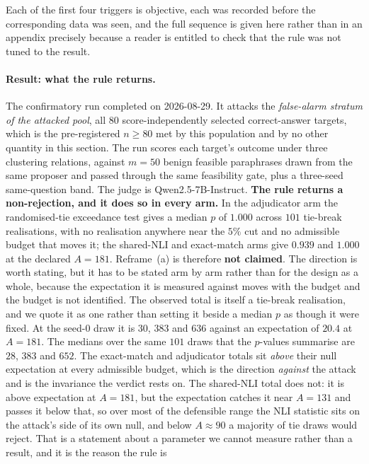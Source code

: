 Each of the first four triggers is objective, each was recorded before the corresponding data
was seen, and the full sequence is given here rather than in an appendix precisely because a
reader is entitled to check that the rule was not tuned to the result.

\paragraph{Result: what the rule returns.}
The confirmatory run completed on 2026-08-29. It attacks the \emph{false-alarm stratum of the
attacked pool}, all $80$ score-independently selected correct-answer targets, which is the
pre-registered $n{\geq}80$ met by this population and by no other quantity in this section. The
run scores each target's outcome under three clustering relations, against $m{=}50$ benign feasible
paraphrases drawn from the same proposer and passed through the same feasibility gate, plus a
three-seed same-question band. The judge is Qwen2.5-7B-Instruct. \textbf{The rule returns a
non-rejection, and it does so in every arm.} In the adjudicator arm the randomised-tie
exceedance test gives a median $p$ of $1.000$ across $101$ tie-break realisations, with no
realisation anywhere near the $5\%$ cut and no admissible budget that moves it; the shared-NLI
and exact-match arms give $0.939$ and $1.000$ at the declared $A{=}181$.
Reframe~(a) is therefore \textbf{not claimed}. The direction is worth stating, but it has to
be stated arm by arm rather than for the design as a whole, because the expectation it is
measured against moves with the budget and the budget is not identified.
The observed total is itself a tie-break realisation, and we quote it as one rather than
setting it beside a median $p$ as though it were fixed. At the seed-$0$ draw it is $30$,
$383$ and $636$ against an expectation of $20.4$ at $A{=}181$. The medians over the same
$101$ draws that the $p$-values summarise are
$28$, $383$ and $652$. The exact-match and adjudicator totals sit \emph{above} their null
expectation at every admissible budget, which is the direction \emph{against} the attack and
is the invariance the verdict rests on. The shared-NLI total does not: it is above
expectation at $A{=}181$, but the expectation catches it near $A{=}131$ and passes it below
that, so over most of the defensible range the NLI statistic sits on the attack's side of its
own null, and below $A{\approx}90$ a majority of tie draws would reject. That is a statement
about a parameter we cannot measure rather than a result, and it is the reason the rule is
